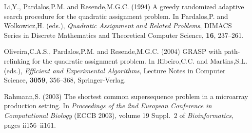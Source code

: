 \documentclass[english]{lni}
\newcommand{\ignore}[1]{}
\begin{document}
\begin{thebibliography}{9}
\ignore{
\bibitem{KOOPMANS57} Koopmans,T.C. and
Beckmann,M.J. (1957) Assignment problems and the location of economic
activities. {\it Econometrica}, {\bf 25}, 53--76.
}

 Li,Y., Pardalos,P.M. and Resende,M.G.C.
(1994) A greedy randomized adaptive search procedure for the quadratic
assignment problem. In Pardalos,P. and Wolkowicz,H. (eds.), {\it Quadratic
Assignment and Related Problems}, DIMACS Series in Discrete Mathematics and
Theoretical Computer Science, {\bf 16}, 237--261.

 Oliveira,C.A.S., Pardalos,P.M.
and Resende,M.G.C. (2004) GRASP with path-relinking for the quadratic assignment
problem. In Ribeiro,C.C. and Martins,S.L. (eds.), {\it Efficient and
Experimental Algorithms}, Lecture Notes in Computer Science, {\bf 3059},
356--368, Springer-Verlag.

Rahmann,S. (2003) The shortest common supersequence problem in a microarray
production setting. In {\it Proceedings of the 2nd European Conference in
Computational Biology} ({ECCB} 2003), volume 19 Suppl.~2 of
{\it Bioinformatics}, pages ii156--ii161.

\end{thebibliography}
\end{document}
